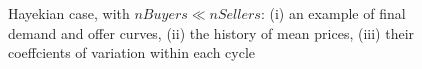 \documentclass[12pt]{report}
\begin{document}
\begin{appendices}
\begin{figure}[htbp]
\begin{center}
\caption{Hayekian case, with $nBuyers \ll nSellers$: (i) an example of final demand and offer curves, (ii) the history of mean prices, (iii) their coeffcients of variation within each cycle}
\label{output_3_1b.png}
\end{center}
\end{figure}


\end{appendices}
\end{document}
